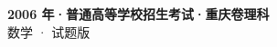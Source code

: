\documentclass[zihao=-4, a4paper]{ctexart}
\begin{document}
\begin{center}
  {\Large\bfseries 2006 年·普通高等学校招生考试·重庆卷理科}\\[4pt]
  {\large 数学 · 试题版}
\end{center}
\medskip
{}

\end{document}
